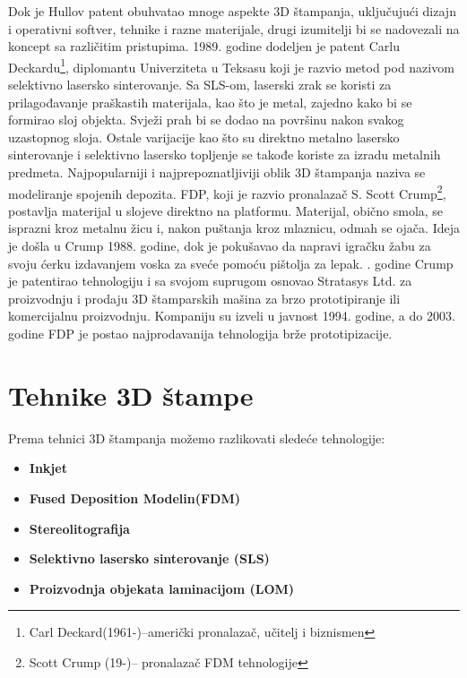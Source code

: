 \documentclass[a4paper]{article}
\begin{document}
Dok je Hullov patent obuhvatao mnoge aspekte 3D štampanja, uključujući dizajn i operativni softver, tehnike i razne materijale, drugi izumitelji bi se nadovezali na koncept sa različitim pristupima. 1989. godine dodeljen je patent Carlu Deckardu\footnote{Carl Deckard(1961-)–američki pronalazač, učitelj i biznismen}, diplomantu Univerziteta u Teksasu koji je razvio metod pod nazivom selektivno lasersko sinterovanje. Sa SLS-om, laserski zrak se koristi za prilagođavanje praškastih materijala, kao što je metal, zajedno kako bi se formirao sloj objekta. 
\bigbreak Svježi prah bi se dodao na površinu nakon svakog uzastopnog sloja. Ostale varijacije kao što su direktno metalno lasersko sinterovanje i selektivno lasersko topljenje se takođe koriste za izradu metalnih predmeta. 
\bigbreak Najpopularniji i najprepoznatljiviji oblik 3D štampanja naziva se modeliranje spojenih depozita. FDP, koji je razvio pronalazač S. Scott Crump\footnote{Scott Crump (19-)– pronalazač FDM tehnologije}, postavlja materijal u slojeve direktno na platformu. Materijal, obično smola, se isprazni kroz metalnu žicu i, nakon puštanja kroz mlaznicu, odmah se ojača. Ideja je došla u Crump 1988. godine, dok je pokušavao da napravi igračku žabu za svoju ćerku izdavanjem voska za sveće pomoću pištolja za lepak. 
. godine Crump je patentirao tehnologiju i sa svojom suprugom osnovao Stratasys Ltd. za proizvodnju i prodaju 3D štamparskih mašina za brzo prototipiranje ili komercijalnu proizvodnju. 
Kompaniju su izveli u javnost 1994. godine, a do 2003. godine FDP je postao najprodavanija tehnologija brže prototipizacije. 

\section{Tehnike 3D štampe\cite{c}}
\label{sec:naslov1}
Prema tehnici 3D štampanja možemo razlikovati sledeće tehnologije:
\begin{itemize}
\item \textbf{Inkjet}
\item \textbf{Fused Deposition Modelin(FDM)}
\item \textbf{Stereolitografija}
\item \textbf{Selektivno lasersko sinterovanje (SLS)}
\item \textbf{Proizvodnja objekata laminacijom (LOM)}
\end{itemize} 



 
\end{document}

